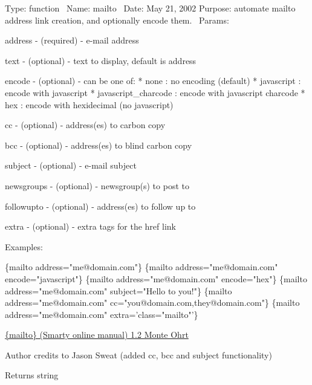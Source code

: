 Type\+: function~\newline
 Name\+: mailto~\newline
 Date\+: May 21, 2002 Purpose\+: automate mailto address link creation, and optionally encode them.~\newline
 Params\+: 
\begin{DoxyPre}
\begin{DoxyItemize}
\item address    - (required) - e-mail address
\item text       - (optional) - text to display, default is address
\item encode     - (optional) - can be one of:
                            * none : no encoding (default)
                            * javascript : encode with javascript
                            * javascript\_charcode : encode with javascript charcode
                            * hex : encode with hexidecimal (no javascript)
\item cc         - (optional) - address(es) to carbon copy
\item bcc        - (optional) - address(es) to blind carbon copy
\item subject    - (optional) - e-mail subject
\item newsgroups - (optional) - newsgroup(s) to post to
\item followupto - (optional) - address(es) to follow up to
\item extra      - (optional) - extra tags for the href link

Examples:

\begin{DoxyPre}
\{mailto address="me@domain.com"\}
\{mailto address="me@domain.com" encode="javascript"\}
\{mailto address="me@domain.com" encode="hex"\}
\{mailto address="me@domain.com" subject="Hello to you!"\}
\{mailto address="me@domain.com" cc="you@domain.com,they@domain.com"\}
\{mailto address="me@domain.com" extra='class="mailto"'\}
\end{DoxyPre}

\end{DoxyItemize}\end{DoxyPre}



\begin{DoxyPre}\hyperlink{}{\{mailto\}
         (Smarty online manual)
 1.2
 Monte Ohrt }
\begin{DoxyAuthor}{Author}
credits to Jason Sweat (added cc, bcc and subject functionality)

\end{DoxyAuthor}

\begin{DoxyReturn}{Returns}
string

\end{DoxyReturn}
\end{DoxyPre}
